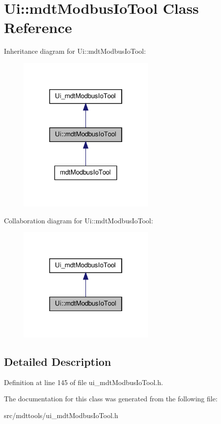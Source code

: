 \hypertarget{class_ui_1_1mdt_modbus_io_tool}{
\section{Ui::mdtModbusIoTool Class Reference}
\label{class_ui_1_1mdt_modbus_io_tool}
}


Inheritance diagram for Ui::mdtModbusIoTool:\nopagebreak
\begin{figure}[H]
\begin{center}
\leavevmode
\includegraphics[width=190pt]{class_ui_1_1mdt_modbus_io_tool__inherit__graph}
\end{center}
\end{figure}


Collaboration diagram for Ui::mdtModbusIoTool:\nopagebreak
\begin{figure}[H]
\begin{center}
\leavevmode
\includegraphics[width=190pt]{class_ui_1_1mdt_modbus_io_tool__coll__graph}
\end{center}
\end{figure}


\subsection{Detailed Description}


Definition at line 145 of file ui\_\-mdtModbusIoTool.h.



The documentation for this class was generated from the following file:\begin{DoxyCompactItemize}
\item 
src/mdttools/ui\_\-mdtModbusIoTool.h\end{DoxyCompactItemize}
